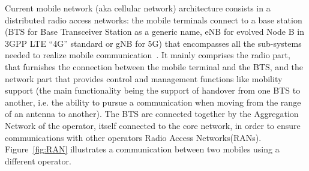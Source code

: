 Current mobile network (aka cellular network) architecture consists in a distributed radio access networks: the mobile terminals connect to a base station (BTS for Base Transceiver Station as a generic name, eNB for evolved Node B in 3GPP LTE “4G” standard or gNB for 5G) that encompasses all the sub-systems needed to realize mobile communication~\cite{bouguen2012lte}. It mainly comprises the radio part, that furnishes the connection between the mobile terminal and the BTS, and the network part that provides control and management functions like mobility support (the main functionality being the support of handover from one BTS to another, i.e. the ability to pursue a communication when moving from the range of an antenna to another).
The BTS are connected together by the Aggregation Network of the operator, itself connected to the core network, in order to ensure communications with other operators Radio Access Networks(RANs). Figure~\ref{fig:RAN} illustrates a communication between two mobiles using a different operator.

